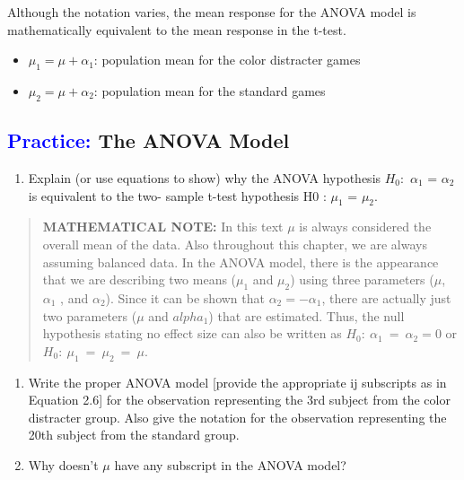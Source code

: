 \documentclass[
]{report}
\providecommand{\tightlist}{%
  \setlength{\itemsep}{0pt}\setlength{\parskip}{0pt}}
\begin{document}
Although the notation varies, the mean response for the ANOVA model is mathematically equivalent to the mean response in the t-test.
\vspace{-1em}

\begin{itemize}
\item $\scriptstyle \mu_1 = \mu + \alpha_1$: population mean for the color distracter games
\item $\scriptstyle \mu_2 = \mu + \alpha_2$: population mean for the standard games
\end{itemize}

\hypertarget{the-anova-model-1}{%
\subsection*{\texorpdfstring{\textcolor{blue}{Practice:} The ANOVA Model}{ The ANOVA Model}}\label{the-anova-model-1}}

\begin{enumerate}
\def\labelenumi{\arabic{enumi}.}
\setcounter{enumi}{15}
\tightlist
\item
  Explain (or use equations to show) why the ANOVA hypothesis \(\scriptstyle H_0:\) \(\scriptstyle \alpha_1\) = \(\scriptstyle \alpha_2\) is equivalent to the two- sample t-test hypothesis H0 : \(\scriptstyle \mu_1\) = \(\scriptstyle \mu_2\).
\end{enumerate}

\begin{quote}
\textbf{MATHEMATICAL NOTE:} In this text \(\scriptstyle \mu\) is always considered the overall mean of the data. Also throughout this chapter, we are always assuming balanced data. In the ANOVA model, there is the appearance that we are describing two means (\(\scriptstyle \mu_1\) and \(\scriptstyle \mu_2\)) using three parameters (\(\scriptstyle \mu\), \(\scriptstyle \alpha_1\) , and \(\scriptstyle \alpha_2\)). Since it can be shown that \(\scriptstyle \alpha_2 = -\alpha_1\), there are actually just two parameters (\(\scriptstyle \mu\) and \(\scriptstyle alpha_1\)) that are estimated. Thus, the null hypothesis stating no effect size can also be written as \(\scriptstyle H_0:\  \alpha_1 \ =\  \alpha_2 = 0\) or \(\scriptstyle H_0:\  \mu_1 \ =\  \mu_2 \ =\  \mu\).
\end{quote}

\begin{enumerate}
\def\labelenumi{\arabic{enumi}.}
\setcounter{enumi}{16}
\item
  Write the proper ANOVA model {[}provide the appropriate ij subscripts as in Equation 2.6{]} for the observation representing the 3rd subject from the color distracter group. Also give the notation for the observation representing the 20th subject from the standard group.
\item
  Why doesn't \(\scriptstyle \mu\) have any subscript in the ANOVA model?
\end{enumerate}
\end{document}
